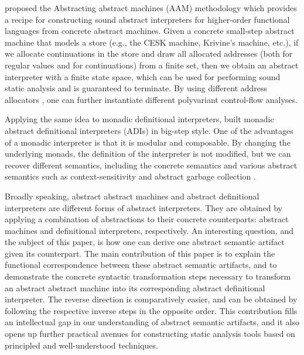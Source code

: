 \documentclass[acmsmall, screen]{acmart}\settopmatter{}
\begin{document}
 proposed the Abstracting abstract machines (AAM)
methodology which provides a recipe for constructing sound abstract interpreters
for higher-order functional languages from concrete abstract machines.
Given a concrete small-step abstract machine that models a store
(e.g., the CESK machine, Krivine's machine, etc.), if we allocate continuations
in the store and draw all allocated addresses (both for regular values and
for continuations) from a finite set, then
we obtain an abstract interpreter with a finite state space, which can be used for
performing sound static analysis and is guaranteed to terminate.
By using different address allocators \cite{Gilray:2016:ACP:2951913.2951936},
one can further instantiate different polyvariant control-flow analyses.

Applying the same idea to monadic definitional interpreters, \citet{darais2017abstracting}
built monadic abstract definitional interpreters (ADIs) in big-step style.
One of the advantages of a monadic interpreter is
that it is modular and composable. By changing the underlying monads, the definition
of the interpreter is not modified, but we can recover different semantics, including
the concrete semantics and various abstract semantics such as context-sensitivity and
abstract garbage collection \cite{Sergey:2013:MAI:2491956.2491979}.

Broadly speaking, abstract abstract machines and abstract definitional interpreters are
different forms of abstract interpreters. They are obtained by applying a combination
of abstractions to their concrete counterparts: abstract machines and definitional
interpreters, respectively. An interesting question, and the subject of this paper, is
how one can derive one abstract semantic artifact given its counterpart.
The main contribution of this paper is to explain the functional correspondence
between these abstract semantic artifacts, and to demonstrate the concrete
syntactic transformation steps necessary to transform an abstract abstract machine
into its corresponding abstract definitional interpreter. The reverse direction
is comparatively easier, and can be obtained by following the respective inverse
steps in the opposite order. This contribution fills an intellectual gap in our
understanding of abstract semantic artifacts, and it also opens up further practical
avenues for constructing static analysis tools based on principled and well-understood
techniques.
\end{document}
